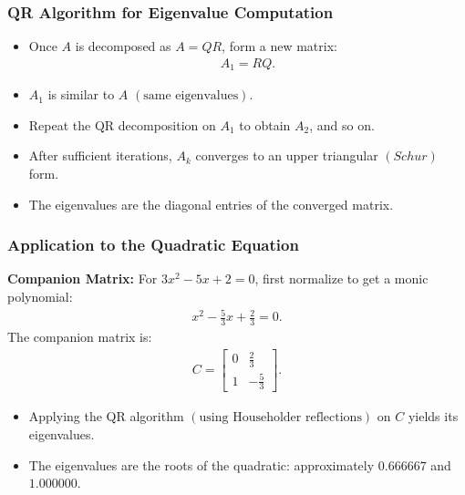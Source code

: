 \documentclass{beamer}
\providecommand{\brak}[1]{\ensuremath{\left(#1\right)}}
\theoremstyle{remark}
\numberwithin{equation}{section}
\begin{document}
\begin{frame}
\frametitle{QR Algorithm for Eigenvalue Computation}
\begin{itemize}
	\item Once $A$ is decomposed as $A = QR$, form a new matrix:
	\begin{align}
	A_{1} = RQ.
	\end{align}
\item $A_1$ is similar to $A$ \brak{\text{same eigenvalues}}.
	\item Repeat the QR decomposition on $A_{1}$ to obtain $A_{2}$, and so on.
	\item After sufficient iterations, $A_k$ converges to an upper triangular \brak{Schur} form.
	\item The eigenvalues are the diagonal entries of the converged matrix.
\end{itemize}
\end{frame}

\begin{frame}
\frametitle{Application to the Quadratic Equation}
\textbf{Companion Matrix:} For $3x^2 - 5x + 2 = 0$, first normalize to get a monic polynomial:
\begin{align}
x^2 - \frac{5}{3}x + \frac{2}{3} = 0.
\end{align}
The companion matrix is:
\begin{align}
C = \begin{bmatrix}
0 & \frac{2}{3} \\
1 & -\frac{5}{3}
\end{bmatrix}.
\end{align}
\begin{itemize}
  \item Applying the QR algorithm \brak{\text{using Householder reflections}} on $C$ yields its eigenvalues.
	\item The eigenvalues are the roots of the quadratic: approximately $0.666667$ and $1.000000$.
\end{itemize}
\end{frame}
\end{document}
